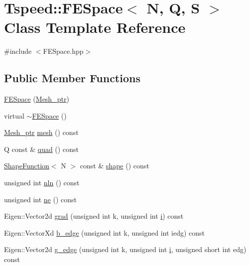 \hypertarget{classTspeed_1_1FESpace}{\section{Tspeed\-:\-:F\-E\-Space$<$ N, Q, S $>$ Class Template Reference}
\label{classTspeed_1_1FESpace}
}


{\ttfamily \#include $<$F\-E\-Space.\-hpp$>$}

\subsection*{Public Member Functions}
\begin{DoxyCompactItemize}
\item 
\hyperlink{classTspeed_1_1FESpace_acbee47bc3d3a47b49bb01a7dc87f205c}{F\-E\-Space} (\hyperlink{namespaceTspeed_a7367a01365c4cc2c1a09305b3effc4e8}{Mesh\-\_\-ptr})
\item 
virtual \hyperlink{classTspeed_1_1FESpace_ae1f9e4f07e24640e68a138c1d11ad900}{$\sim$\-F\-E\-Space} ()
\item 
\hyperlink{namespaceTspeed_a7367a01365c4cc2c1a09305b3effc4e8}{Mesh\-\_\-ptr} \hyperlink{classTspeed_1_1FESpace_a52581134e398195d098ad4f1985a4cbb}{mesh} () const 
\item 
Q const \& \hyperlink{classTspeed_1_1FESpace_a118bd2d5becbd61c593efa546a525992}{quad} () const 
\item 
\hyperlink{classTspeed_1_1ShapeFunction}{Shape\-Function}$<$ N $>$ const \& \hyperlink{classTspeed_1_1FESpace_ac9829cde89c0e1a5252925c1e9322d47}{shape} () const 
\item 
unsigned int \hyperlink{classTspeed_1_1FESpace_ae32c88a6615cefdf1273e2525a62fcfe}{nln} () const 
\item 
unsigned int \hyperlink{classTspeed_1_1FESpace_a3e6a6031a7b2033f90ce1d0f3b6a378d}{ne} () const 
\item 
Eigen\-::\-Vector2d \hyperlink{classTspeed_1_1FESpace_a5b658aa075508f9ead3b4cac4743bfac}{grad} (unsigned int k, unsigned int \hyperlink{vtk__vector__out_8m_a6f6ccfcf58b31cb6412107d9d5281426}{i}) const 
\item 
Eigen\-::\-Vector\-Xd \hyperlink{classTspeed_1_1FESpace_afee2268392456e7b872a8c3d77f732c7}{b\-\_\-edge} (unsigned int k, unsigned int iedg) const 
\item 
Eigen\-::\-Vector2d \hyperlink{classTspeed_1_1FESpace_aee7e220399d909994b7b91f4fa82f1ca}{g\-\_\-edge} (unsigned int k, unsigned int \hyperlink{vtk__vector__out_8m_a6f6ccfcf58b31cb6412107d9d5281426}{i}, unsigned short int edg) const 

\end{DoxyCompactItemize}
